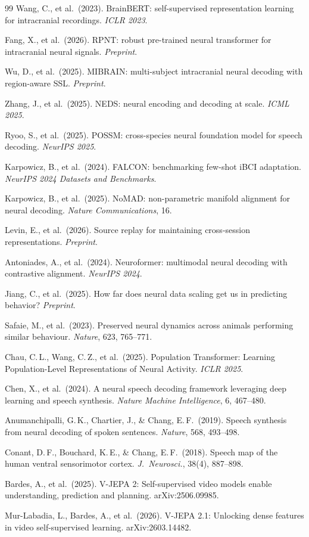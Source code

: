 \documentclass[11pt,letterpaper]{article}
\begin{document}
\begin{thebibliography}{99}
Wang, C., et al.\ (2023).
BrainBERT: self-supervised representation learning for intracranial recordings.
\textit{ICLR 2023}.

Fang, X., et al.\ (2026).
RPNT: robust pre-trained neural transformer for intracranial neural signals.
\textit{Preprint}.

Wu, D., et al.\ (2025).
MIBRAIN: multi-subject intracranial neural decoding with region-aware SSL.
\textit{Preprint}.

Zhang, J., et al.\ (2025).
NEDS: neural encoding and decoding at scale.
\textit{ICML 2025}.

Ryoo, S., et al.\ (2025).
POSSM: cross-species neural foundation model for speech decoding.
\textit{NeurIPS 2025}.

Karpowicz, B., et al.\ (2024).
FALCON: benchmarking few-shot iBCI adaptation.
\textit{NeurIPS 2024 Datasets and Benchmarks}.

Karpowicz, B., et al.\ (2025).
NoMAD: non-parametric manifold alignment for neural decoding.
\textit{Nature Communications}, 16.

Levin, E., et al.\ (2026).
Source replay for maintaining cross-session representations.
\textit{Preprint}.

Antoniades, A., et al.\ (2024).
Neuroformer: multimodal neural decoding with contrastive alignment.
\textit{NeurIPS 2024}.

Jiang, C., et al.\ (2025).
How far does neural data scaling get us in predicting behavior?
\textit{Preprint}.

Safaie, M., et al.\ (2023).
Preserved neural dynamics across animals performing similar behaviour.
\textit{Nature}, 623, 765--771.

Chau, C.\,L., Wang, C.\,Z., et al.\ (2025).
Population Transformer: Learning Population-Level Representations of Neural Activity.
\textit{ICLR 2025}.

Chen, X., et al.\ (2024).
A neural speech decoding framework leveraging deep learning and speech synthesis.
\textit{Nature Machine Intelligence}, 6, 467--480.

Anumanchipalli, G.\,K., Chartier, J., \& Chang, E.\,F.\ (2019).
Speech synthesis from neural decoding of spoken sentences.
\textit{Nature}, 568, 493--498.

Conant, D.\,F., Bouchard, K.\,E., \& Chang, E.\,F.\ (2018).
Speech map of the human ventral sensorimotor cortex.
\textit{J.\ Neurosci.}, 38(4), 887--898.

Bardes, A., et al.\ (2025).
V-JEPA 2: Self-supervised video models enable understanding, prediction and planning.
arXiv:2506.09985.

Mur-Labadia, L., Bardes, A., et al.\ (2026).
V-JEPA 2.1: Unlocking dense features in video self-supervised learning.
arXiv:2603.14482.

\end{thebibliography}
\end{document}
